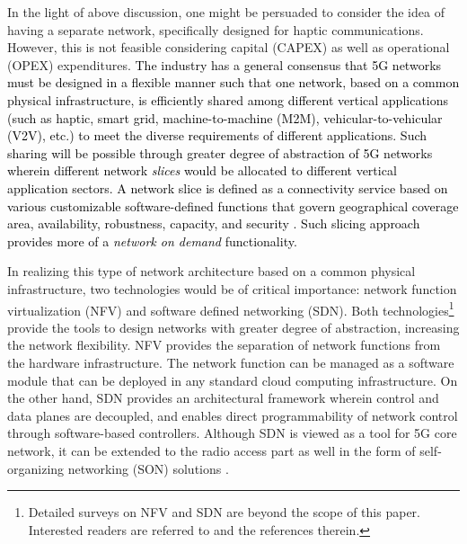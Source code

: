 \documentclass[journal]{IEEEtran}
\begin{document}
In the light of above discussion, one might be persuaded to consider the idea of having a separate network, specifically designed for haptic communications. However, this is not feasible considering capital (CAPEX) as well as operational (OPEX) expenditures. \textcolor{black}{The industry has a general consensus that 5G networks must be designed in a flexible manner such that one network, based on a common physical infrastructure, is efficiently shared among different vertical applications (such as haptic, smart grid, machine-to-machine (M2M), vehicular-to-vehicular (V2V), etc.) to meet the diverse requirements of different applications. Such sharing will be possible through greater degree of abstraction of 5G networks wherein different network \emph{slices} would be allocated to different vertical application sectors. A network slice is defined as a connectivity service based on various customizable software-defined functions that govern geographical coverage area, availability, robustness, capacity, and security \cite{eric_wp}. Such slicing approach provides more of a \emph{network on demand} functionality.}




In realizing this type of network architecture based on a common physical infrastructure, two technologies would be of critical importance: network function virtualization (NFV) and software defined networking (SDN). Both technologies\footnote{Detailed surveys on NFV and SDN are beyond the scope of this paper. Interested readers are referred to \cite{NFV,SDN} and the references therein. } provide the tools to design networks with greater degree of abstraction, increasing the network flexibility.  NFV provides the separation of network functions from the hardware infrastructure. The network function can be managed as a software module that can be deployed in any standard cloud computing infrastructure. On the other hand, SDN provides an architectural framework wherein control and data planes are decoupled, and enables direct programmability of network control through software-based controllers.   Although SDN is viewed as a tool for 5G core network, it can be extended to the radio access part as well in the form of self-organizing networking (SON) solutions \cite{SDN_cellular}.
\end{document}
